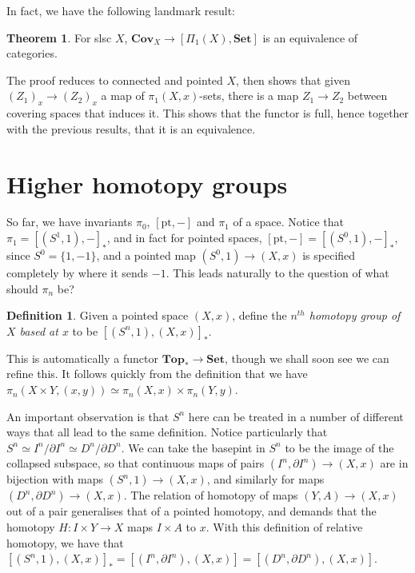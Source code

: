 \documentclass{tufte-handout}
\def\pt {\mathrm{pt}}
\def\Set {\mathbf{Set}}
\def\Top {\mathbf{Top}}
\def\Cov {\mathbf{Cov}}
\theoremstyle{definition}
\newtheorem{definition}{Definition}
\newtheorem{theorem}{Theorem}
\begin{document}
In fact, we have the following landmark result:

\begin{theorem}
For slsc $X$, $\Cov_X\to [\Pi_1(X),\Set]$ is an equivalence of categories.
\end{theorem}

The proof reduces to connected and pointed $X$, then shows that given $(Z_1)_x \to (Z_2)_x$ a map of $\pi_1(X,x)$-sets, there is a map $Z_1 \to Z_2$ between covering spaces that induces it. This shows that the functor is full, hence together with the previous results, that it is an equivalence.

\section{Higher homotopy groups}

So far, we have invariants $\pi_0$, $[\pt,-]$ and $\pi_1$ of a space. Notice that $\pi_1 = [(S^1,1),-]_*$, and in fact for pointed spaces, $[\pt,-] = [(S^0,1),-]_*$, since $S^0 = \{1,-1\}$, and a pointed map $(S^0,1) \to (X,x)$ is specified completely by where it sends $-1$. This leads naturally to the question of what should $\pi_n$ be?

\begin{definition}
Given a pointed space $(X,x)$, define the \emph{$n^{th}$ homotopy group of $X$ based at $x$} to be $[(S^n,1),(X,x)]_*$.
\end{definition}

This is automatically a functor $\Top_* \to \Set$, though we shall soon see we can refine this. It follows quickly from the definition that we have $\pi_n(X\times Y, (x,y)) \simeq \pi_n(X,x)\times \pi_n(Y,y)$.


An important observation is that $S^n$ here can be treated in a number of different ways that all lead to the same definition. Notice particularly that $S^n \simeq I^n / \partial I^n \simeq D^n / \partial D^n$. We can take the basepint in $S^n$ to be the image of the collapsed subspace, so that continuous maps of pairs $(I^n,\partial I^n) \to (X,x)$ are in bijection with maps $(S^n,1) \to (X,x)$, and similarly for maps $(D^n,\partial D^n) \to (X,x)$. The relation of homotopy of maps $(Y,A) \to (X,x)$ out of a pair generalises that of a pointed homotopy, and demands that the homotopy $H\colon I \times Y\to X$ maps $I\times A$ to $x$. With this definition of relative homotopy, we have that $[(S^n,1),(X,x)]_* = [(I^n,\partial I^n),(X,x)] = [(D^n,\partial D^n),(X,x)]$.
\end{document}
